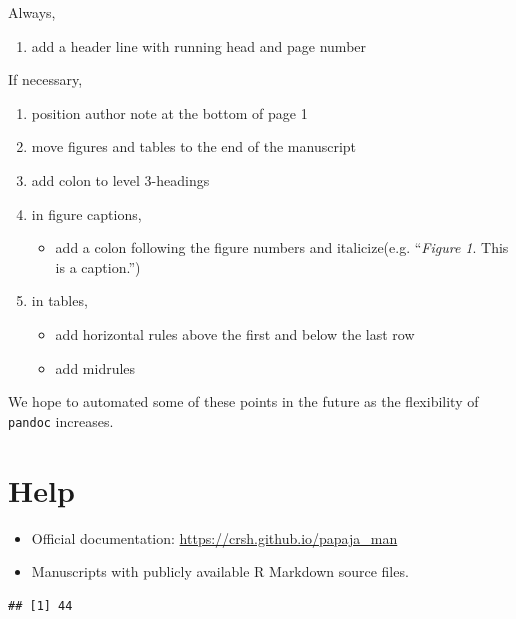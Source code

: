 \documentclass[man,floatsintext]{apa6}
\providecommand{\tightlist}{%
  \setlength{\itemsep}{0pt}\setlength{\parskip}{0pt}}
\theoremstyle{definition}
\theoremstyle{definition}
\theoremstyle{definition}
\theoremstyle{remark}
\begin{document}
Always,

\begin{enumerate}
\def\labelenumi{\arabic{enumi}.}
\tightlist
\item
  add a header line with running head and page number
\end{enumerate}

If necessary,

\begin{enumerate}
\def\labelenumi{\arabic{enumi}.}
\setcounter{enumi}{1}
\tightlist
\item
  position author note at the bottom of page 1
\item
  move figures and tables to the end of the manuscript
\item
  add colon to level 3-headings
\item
  in figure captions,

  \begin{itemize}
  \tightlist
  \item
    add a colon following the figure numbers and italicize(e.g.
    \enquote{\emph{Figure 1}. This is a caption.})
  \end{itemize}
\item
  in tables,

  \begin{itemize}
  \tightlist
  \item
    add horizontal rules above the first and below the last row
  \item
    add midrules
  \end{itemize}
\end{enumerate}

We hope to automated some of these points in the future as the
flexibility of \texttt{pandoc} increases.

\section{Help}\label{help}

\begin{itemize}
\tightlist
\item
  Official documentation: \url{https://crsh.github.io/papaja_man}
\item
  Manuscripts with publicly available R Markdown source files.
\end{itemize}

\begin{verbatim}
## [1] 44
\end{verbatim}
\end{document}
